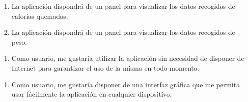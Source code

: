 \begin{enumerate}[resume=req-usuario,label=\textbf{\texttt{RU-\arabic*}}]
\begin{enumerate}[resume=req-funcionales,label=\textbf{\texttt{RF-\arabic*}}]
                \item \label{req:funcionales:visualizar_calorias} La aplicación dispondrá de un panel para visualizar los datos recogidos de calorías quemadas.
                \item \label{req:funcionales:visualizar_peso} La aplicación dispondrá de un panel para visualizar los datos recogidos de peso.
            \end{enumerate}
        \end{enumerate}
        \begin{enumerate}[resume=req-usuario,label=\textbf{\texttt{RU-\arabic*}}]
            \item \label{req:usuario:app_sin_internet} Como usuario, me gustaría utilizar la aplicación sin necesidad de disponer de Internet para garantizar el uso de la misma en todo momento.
        \end{enumerate}
        \begin{enumerate}[resume=req-usuario,label=\textbf{\texttt{RU-\arabic*}}]
            \item \label{req:usuario:interfaz_grafica} Como usuario, me gustaría disponer de una interfaz gráfica que me permita usar fácilmente la aplicación en cualquier dispositivo.
        \end{enumerate}
